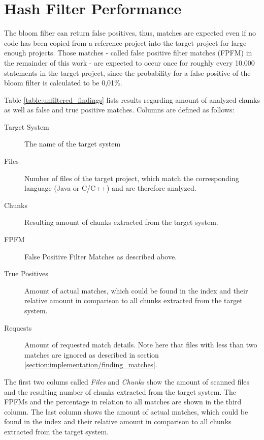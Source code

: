 \section{Hash Filter Performance}\label{section:evaluation/findings/hash_filter_performance}
The bloom filter can return false positives, thus, matches are expected even if no code has been copied from a reference project into the target project for large enough projects.
Those matches - called false positive filter matches (FPFM) in the remainder of this work - are expected to occur once for roughly every 10.000 statements in the target project, since the probability for a false positive of the bloom filter is calculated to be 0,01\%. 

Table \autoref{table:unfiltered_findings} lists results regarding amount of analyzed chunks as well as false and true positive matches.
Columns are defined as follows:
\begin{description}
	\item[Target System] The name of the target system
	\item[Files] Number of files of the target project, which match the corresponding language (Java or C/C++) and are therefore analyzed.
	\item[Chunks] Resulting amount of chunks extracted from the target system.
	\item[FPFM] False Positive Filter Matches as described above.
	\item[True Positives] Amount of actual matches, which could be found in the index and their relative amount in comparison to all chunks extracted from the target system.
	\item[Requests] Amount of requested match details. Note here that files with less than two matches are ignored as described in section \ref{section:implementation/finding_matches}.
\end{description}
The first two colums called \textit{Files} and \textit{Chunks} show the amount of scanned files and the resulting number of chunks extracted from the target system.
The FPFMs and the percentage in relation to all matches are shown in the third column.
The last column shows the amount of actual matches, which could be found in the index and their relative amount in comparison to all chunks extracted from the target system.

